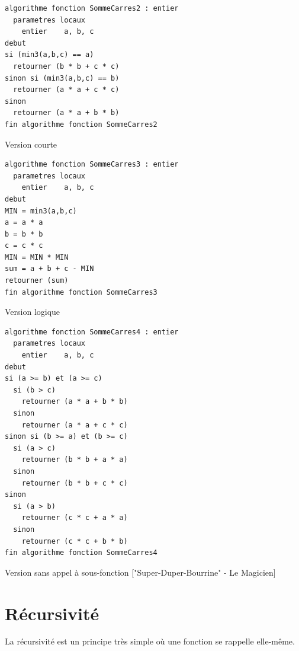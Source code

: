 \documentclass[11pt,a4paper]{article}
\begin{document}
\begin{table}[ht!]
  \centering
\begin{lstlisting}[style=algorithmique]
algorithme fonction SommeCarres2 : entier
  parametres locaux
    entier    a, b, c
debut
si (min3(a,b,c) == a)
  retourner (b * b + c * c)
sinon si (min3(a,b,c) == b)
  retourner (a * a + c * c)
sinon
  retourner (a * a + b * b)
fin algorithme fonction SommeCarres2 \end{lstlisting}
  \caption{Version courte}
\end{table}

\pagebreak

\begin{table}[ht!]
  \centering
\begin{lstlisting}[style=algorithmique]
algorithme fonction SommeCarres3 : entier
  parametres locaux
    entier    a, b, c
debut
MIN = min3(a,b,c)
a = a * a
b = b * b
c = c * c
MIN = MIN * MIN
sum = a + b + c - MIN
retourner (sum)
fin algorithme fonction SommeCarres3 \end{lstlisting}
  \caption{Version logique}
\end{table}

\bigskip

\begin{table}[ht!]
  \centering
\begin{lstlisting}[style=algorithmique]
algorithme fonction SommeCarres4 : entier
  parametres locaux
    entier    a, b, c
debut
si (a >= b) et (a >= c)
  si (b > c)
    retourner (a * a + b * b)
  sinon
    retourner (a * a + c * c)
sinon si (b >= a) et (b >= c)
  si (a > c)
    retourner (b * b + a * a)
  sinon
    retourner (b * b + c * c)
sinon
  si (a > b)
    retourner (c * c + a * a)
  sinon
    retourner (c * c + b * b)
fin algorithme fonction SommeCarres4 \end{lstlisting}
  \caption{Version sans appel à sous-fonction ["Super-Duper-Bourrine" - Le Magicien]}
\end{table}


\clearpage


\section{Récursivité}

\bigskip

La récursivité est un principe très simple où une fonction se rappelle elle-même. %
\end{document}
